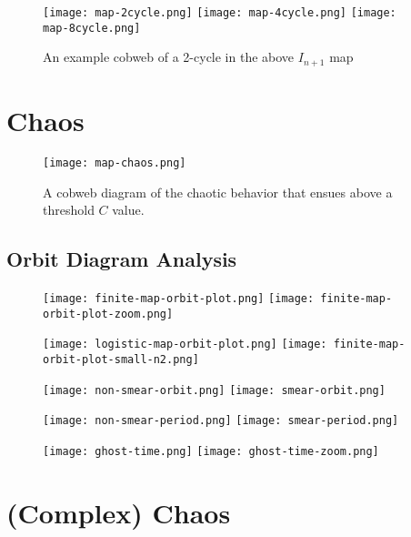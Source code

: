 \documentclass[12pt]{article}
\begin{document}
\begin{figure}[htbp]
\centerline{\texttt{[image: map-2cycle.png]}
  \texttt{[image: map-4cycle.png]}  \texttt{[image: map-8cycle.png]}}
\caption[]{\label{fig:cycles} An example cobweb of a 2-cycle in the above $I_{n+1}$ map}
\end{figure}


\section*{Chaos}
\begin{figure}[htbp]
\centerline{\texttt{[image: map-chaos.png]}}
\caption[]{\label{fig:chaos} A cobweb diagram of the chaotic behavior that ensues above a
  threshold $C$ value.}
\end{figure}
\subsection*{Orbit Diagram Analysis}

\begin{figure}[htbp]
\centerline{\texttt{[image: finite-map-orbit-plot.png]} \texttt{[image: finite-map-orbit-plot-zoom.png]}}
\caption[]{\label{fig:orbit} }
\end{figure}


\begin{figure}
\centerline{\texttt{[image: logistic-map-orbit-plot.png]} \texttt{[image: finite-map-orbit-plot-small-n2.png]}}
\caption[]{\label{fig:logistic-comp} }
\end{figure}

\begin{figure}[htbp]
\centerline{\texttt{[image: non-smear-orbit.png]} \texttt{[image: smear-orbit.png]}}
\centerline{\texttt{[image: non-smear-period.png]} \texttt{[image: smear-period.png]}}
\caption[]{\label{fig:non-smear-orbit} }
\end{figure}

\begin{figure}[htbp]
\centerline{\texttt{[image: ghost-time.png]} \texttt{[image: ghost-time-zoom.png]}}
\caption[]{\label{fig:ghost-timeseries} }
\end{figure}
\section*{(Complex) Chaos}
\end{document}
